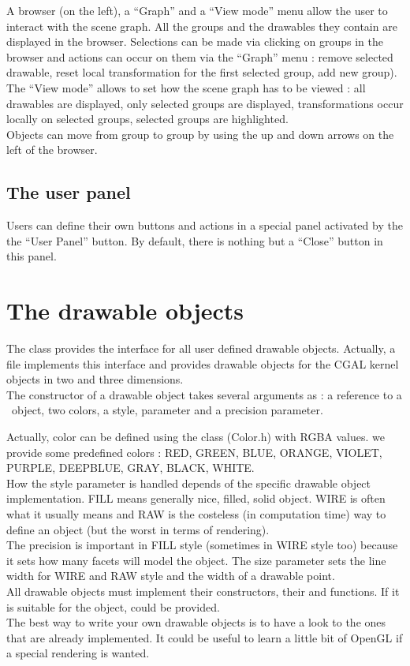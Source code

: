A browser (on the left), a ``Graph'' and a ``View mode'' menu 
allow the user to interact with the scene graph. All the groups 
and the drawables they contain are displayed in the
browser. Selections can be made via clicking on groups in the browser
and actions can occur on them via the ``Graph'' menu : remove
selected drawable, reset local transformation for the first selected group, 
add new group).\\
The ``View mode'' allows to set how the scene graph has to be viewed : 
all drawables are displayed, only selected groups are displayed,
transformations occur locally on selected groups, selected groups are 
highlighted. \\
Objects can move from group to group by using the up and down arrows
on the left of the browser.

\subsection{The user panel}

Users can define their own buttons and actions in a special panel
activated by the the ``User Panel'' button. By default, there is nothing 
but a ``Close'' button in this panel.

\section{The drawable objects}

The class  provides the interface for all user
defined drawable objects. Actually, a file 
implements this interface and provides drawable objects for the CGAL
kernel objects in two and three dimensions.\\
The constructor of a drawable object takes several arguments as :
a reference to a \cgal\ object, two colors, a style, parameter and a
precision parameter.

Actually, color can be defined using the class  (Color.h) with
RGBA values. we provide some predefined colors : RED, GREEN, BLUE,
ORANGE, VIOLET, PURPLE, DEEPBLUE, GRAY, BLACK, WHITE.\\
How the style parameter is handled depends of the specific drawable
object implementation. FILL means generally nice, filled, solid
object. WIRE is often what it usually means and RAW is the costeless
(in computation time) way to define an object (but the worst in terms
of rendering).\\
The precision is important in FILL style (sometimes in WIRE style
too) because it sets how many facets will model the object. The size
parameter 
sets the line width for WIRE and RAW style and the width of a drawable
point. \\
All drawable objects must implement their constructors, their
 and  functions. If it is suitable for
the object,  could be provided.\\
The best way to write your own drawable objects is to have a look to
the ones that are already implemented. It could be useful to learn a 
little bit of OpenGL if a special rendering is wanted.

